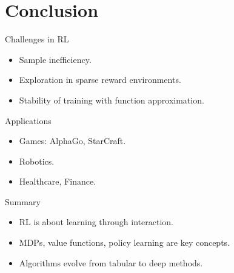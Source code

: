 \documentclass{beamer}
\begin{document}
\section{Conclusion}
\begin{frame}{Challenges in RL}
 \begin{itemize}
   \item Sample inefficiency.
   \item Exploration in sparse reward environments.
   \item Stability of training with function approximation.
 \end{itemize}
\end{frame}

\begin{frame}{Applications}
 \begin{itemize}
   \item Games: AlphaGo, StarCraft.
   \item Robotics.
   \item Healthcare, Finance.
 \end{itemize}
\end{frame}

\begin{frame}{Summary}
 \begin{itemize}
   \item RL is about learning through interaction.
   \item MDPs, value functions, policy learning are key concepts.
   \item Algorithms evolve from tabular to deep methods.
 \end{itemize}
\end{frame}
\end{document}

